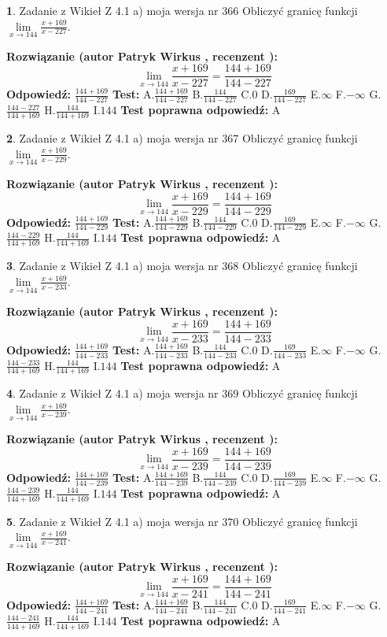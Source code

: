 \documentclass[12pt, a4paper]{article}
\theoremstyle{definition} %
\newtheorem{zad}{}
\newcommand{\zadStart}[1]{\begin{zad}#1\newline}
\newcommand{\zadStop}{\end{zad}}
\newcommand{\rozwStart}[2]{\noindent \textbf{Rozwiązanie (autor #1 , recenzent #2): }\newline}
\newcommand{\rozwStop}{\newline}
\newcommand{\odpStart}{\noindent \textbf{Odpowiedź:}\newline}
\newcommand{\odpStop}{\newline}
\newcommand{\testStart}{\noindent \textbf{Test:}\newline}
\newcommand{\testStop}{\newline}
\newcommand{\kluczStart}{\noindent \textbf{Test poprawna odpowiedź:}\newline}
\newcommand{\kluczStop}{\newline}
\begin{document}
\zadStart{Zadanie z Wikieł Z 4.1 a) moja wersja nr 366}
Obliczyć granicę funkcji $\lim\limits_{x\to144}\frac{x+169}{x-227}$.
\zadStop
\rozwStart{Patryk Wirkus}{}
$$\lim\limits_{x\to144}\frac{x+169}{x-227} = \frac{144+169}{144-227}$$
\rozwStop
\odpStart
$\frac{144+169}{144-227}$
\odpStop
\testStart
A.$\frac{144+169}{144-227}$
B.$\frac{144}{144-227}$
C.$0$
D.$\frac{169}{144-227}$
E.$\infty$
F.$-\infty$
G.$\frac{144-227}{144+169}$
H.$\frac{144}{144+169}$
I.$144$
\testStop
\kluczStart
A
\kluczStop



\zadStart{Zadanie z Wikieł Z 4.1 a) moja wersja nr 367}
Obliczyć granicę funkcji $\lim\limits_{x\to144}\frac{x+169}{x-229}$.
\zadStop
\rozwStart{Patryk Wirkus}{}
$$\lim\limits_{x\to144}\frac{x+169}{x-229} = \frac{144+169}{144-229}$$
\rozwStop
\odpStart
$\frac{144+169}{144-229}$
\odpStop
\testStart
A.$\frac{144+169}{144-229}$
B.$\frac{144}{144-229}$
C.$0$
D.$\frac{169}{144-229}$
E.$\infty$
F.$-\infty$
G.$\frac{144-229}{144+169}$
H.$\frac{144}{144+169}$
I.$144$
\testStop
\kluczStart
A
\kluczStop



\zadStart{Zadanie z Wikieł Z 4.1 a) moja wersja nr 368}
Obliczyć granicę funkcji $\lim\limits_{x\to144}\frac{x+169}{x-233}$.
\zadStop
\rozwStart{Patryk Wirkus}{}
$$\lim\limits_{x\to144}\frac{x+169}{x-233} = \frac{144+169}{144-233}$$
\rozwStop
\odpStart
$\frac{144+169}{144-233}$
\odpStop
\testStart
A.$\frac{144+169}{144-233}$
B.$\frac{144}{144-233}$
C.$0$
D.$\frac{169}{144-233}$
E.$\infty$
F.$-\infty$
G.$\frac{144-233}{144+169}$
H.$\frac{144}{144+169}$
I.$144$
\testStop
\kluczStart
A
\kluczStop



\zadStart{Zadanie z Wikieł Z 4.1 a) moja wersja nr 369}
Obliczyć granicę funkcji $\lim\limits_{x\to144}\frac{x+169}{x-239}$.
\zadStop
\rozwStart{Patryk Wirkus}{}
$$\lim\limits_{x\to144}\frac{x+169}{x-239} = \frac{144+169}{144-239}$$
\rozwStop
\odpStart
$\frac{144+169}{144-239}$
\odpStop
\testStart
A.$\frac{144+169}{144-239}$
B.$\frac{144}{144-239}$
C.$0$
D.$\frac{169}{144-239}$
E.$\infty$
F.$-\infty$
G.$\frac{144-239}{144+169}$
H.$\frac{144}{144+169}$
I.$144$
\testStop
\kluczStart
A
\kluczStop



\zadStart{Zadanie z Wikieł Z 4.1 a) moja wersja nr 370}
Obliczyć granicę funkcji $\lim\limits_{x\to144}\frac{x+169}{x-241}$.
\zadStop
\rozwStart{Patryk Wirkus}{}
$$\lim\limits_{x\to144}\frac{x+169}{x-241} = \frac{144+169}{144-241}$$
\rozwStop
\odpStart
$\frac{144+169}{144-241}$
\odpStop
\testStart
A.$\frac{144+169}{144-241}$
B.$\frac{144}{144-241}$
C.$0$
D.$\frac{169}{144-241}$
E.$\infty$
F.$-\infty$
G.$\frac{144-241}{144+169}$
H.$\frac{144}{144+169}$
I.$144$
\testStop
\kluczStart
A
\kluczStop
\end{document}
